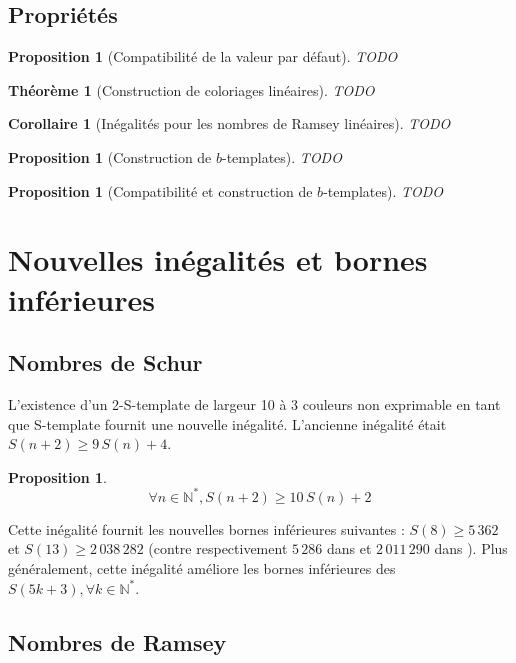 \documentclass{article}
\newtheorem{theorem}[definition]{Théorème}
\newtheorem{corollary}[definition]{Corollaire}
\newtheorem{proposition}[definition]{Proposition}
\begin{document}
\subsection{Propriétés}

\begin{proposition}[Compatibilité de la valeur par défaut]
TODO
\end{proposition}

\begin{theorem}[Construction de coloriages linéaires]
TODO
\end{theorem}

\begin{corollary}[Inégalités pour les nombres de Ramsey linéaires]
TODO
\end{corollary}

\begin{proposition}[Construction de \(b\)-templates]
TODO
\end{proposition}

\begin{proposition}[Compatibilité et construction de \(b\)-templates]
TODO
\end{proposition}

\section{Nouvelles inégalités et bornes inférieures}
\label{sec:results}

\subsection{Nombres de Schur}

L'existence d'un 2-S-template de largeur 10 à 3 couleurs non exprimable en tant que S-template fournit une nouvelle inégalité. L'ancienne inégalité était \(S(n + 2) \geqslant 9 \, S(n) + 4\).

\begin{proposition}
	\[\forall n \in \mathbb{N}^*, S(n + 2) \geqslant 10 \, S(n) + 2\]
\end{proposition}

Cette inégalité fournit les nouvelles bornes inférieures suivantes : \(S(8) \geqslant 5\,362\) et \(S(13) \geqslant 2\,038\,282\) (contre respectivement \(5\,286\) dans \cite{RowleyRamsey} et \(2\,011\,290\) dans \cite{schurboyz}). Plus généralement, cette inégalité améliore les bornes inférieures des \(S(5 k + 3), \forall k \in \mathbb{N}^*\).

\subsection{Nombres de Ramsey}
\end{document}
